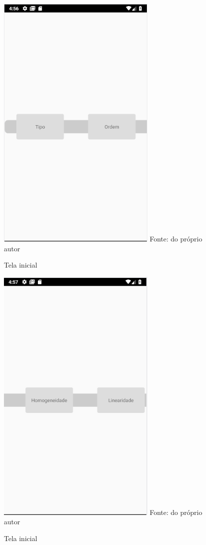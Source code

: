\begin{figure}[H]
\centering
\caption{Tela inicial}
\includegraphics[scale=0.72]{figuras/modo_classificacao_1.png}
\small{Fonte: do próprio autor}
\end{figure}

\begin{figure}[H]
\centering
\caption{Tela inicial}
\includegraphics[scale=0.72]{figuras/modo_classificacao_2.png}
\small{Fonte: do próprio autor}
\end{figure}

